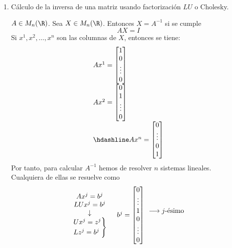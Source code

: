 \begin{enumerate}[label=\color{lightblue}\arabic*)]
	\item Cálculo de la inversa de una matriz usando factorización $LU$ o Cholesky.
	
	$A\in M_n(\R)$. Sea $X\in M_n(\R)$. Entonces $X=A^{-1}$ si se cumple \[ AX=I \]Si $x^1,x^2,\dots,x^n$ son las columnas de $X$, entonces se tiene:\[ \begin{array}{l}
		Ax^1=\begin{bmatrix}
			1\\
			0\\
			\vdots\\
			0
		\end{bmatrix}\\
		Ax^2=\begin{bmatrix}
			0\\
			1\\
			\vdots\\
			0
		\end{bmatrix}\\ \hdashline
		Ax^n=\begin{bmatrix}
			0\\
			\vdots\\
			0\\
			1
		\end{bmatrix}
	\end{array} \]Por tanto, para calcular $A^{-1}$ hemos de resolver $n$ sistemas lineales. Cualquiera de ellas se resuelve como \[ \begin{array}{cl}
	\begin{array}{c}
		Ax^j=b^j\\
		LUx^j=b^j\\
		\downarrow\\
		\begin{rcases}
			Ux^j=z^j\\
			Lz^j=b^j
		\end{rcases}
	\end{array} & b^j=\begin{bmatrix}
	0\\
	\vdots\\
	1\\
	0\\
	\vdots\\
	0
	\end{bmatrix}\begin{array}{l}
	\\
	\\
	\longrightarrow j\text{-ésimo}\\
	\\
	\\
	\\
	\end{array}\\
	\end{array} \]
\end{enumerate}